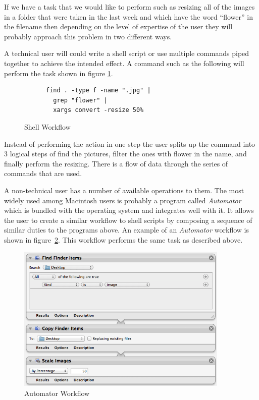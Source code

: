 If we have a task that we would like to perform such as resizing all of the
images in a folder that were taken in the last week and which have the word
``flower'' in the filename then depending on the level of expertise of the user
they will probably approach this problem in two different ways.

A technical user will could write a shell script or use multiple commands
piped together to achieve the intended effect. A command such as the following
will perform the task shown in figure \ref{fig:shell}.

\begin{figure}[ht!]
  \centering
	\begin{verbatim}
	  find . -type f -name ".jpg" |
	    grep "flower" |
	    xargs convert -resize 50%
	\end{verbatim}
  \caption{Shell Workflow}
  \label{fig:shell}
\end{figure}

Instead of performing the action in one step the user splits up the command
into 3 logical steps of find the pictures, filter the ones with flower in the
name, and finally perform the resizing. There is a flow of data through the
series of commands that are used.

A non-technical user has a number of available operations to them. The most
widely used among Macintosh users is probably a program called \emph{Automator}
which is bundled with the operating system and integrates well with it. It
allows the user to create a similar workflow to shell scripts by composing
a sequence of similar duties to the programs above. An example of an
\emph{Automator} workflow is shown in figure~\ref{fig:automator}. This workflow
performs the same task as described above.

\begin{figure}[ht!]
  \centering
  \includegraphics[width=0.9\textwidth]{images/automator}
  \caption{Automator Workflow}
  \label{fig:automator}
\end{figure}

